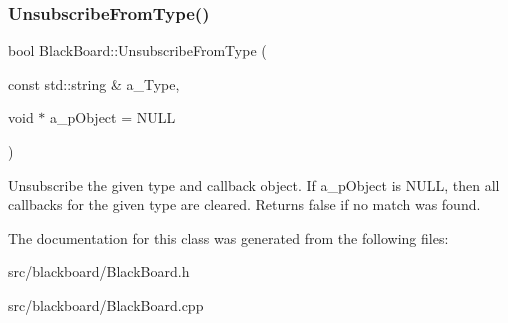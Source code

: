 \subsubsection{\texorpdfstring{Unsubscribe\+From\+Type()}{UnsubscribeFromType()}}
{\footnotesize\ttfamily bool Black\+Board\+::\+Unsubscribe\+From\+Type (\begin{DoxyParamCaption}\item[{const std\+::string \&}]{a\+\_\+\+Type,  }\item[{void $\ast$}]{a\+\_\+p\+Object = {\ttfamily NULL} }\end{DoxyParamCaption})}

Unsubscribe the given type and callback object. If a\+\_\+p\+Object is N\+U\+LL, then all callbacks for the given type are cleared. Returns false if no match was found. 

The documentation for this class was generated from the following files\+:\begin{DoxyCompactItemize}
\item 
src/blackboard/Black\+Board.\+h\item 
src/blackboard/Black\+Board.\+cpp\end{DoxyCompactItemize}
